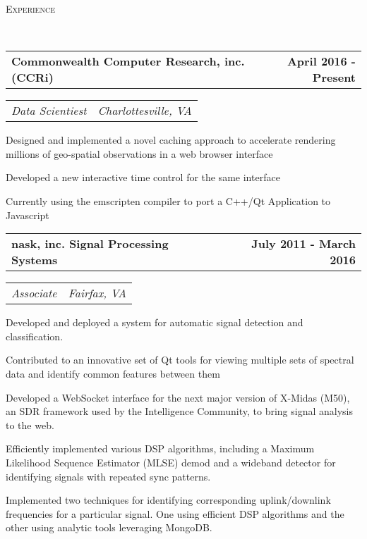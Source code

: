 \documentclass[10pt]{article}
\makeatletter
\newenvironment{changemargin}[2]{%
  \begin{list}{}{%
    \setlength{\topsep}{0pt}%
    \setlength{\leftmargin}{#1}%
    \setlength{\rightmargin}{#2}%
    \setlength{\listparindent}{\parindent}%
    \setlength{\itemindent}{\parindent}%
    \setlength{\parsep}{\parskip}%
  }%
  \item[]}{\end{list}
}
\newcommand{\lineover}{
	\begin{changemargin}{-0.05in}{-0.05in}
		\vspace*{-8pt}
		\hrulefill \\
		\vspace*{-2pt}
	\end{changemargin}
}
\newenvironment{body} {
	\begin{changemargin}{-0.25in}{-0.5in}
  }
	{\end{changemargin}
}
\newcommand{\headerrule}[1]{
    \vspace*{5pt}
    \begin{changemargin}{-0.5in}{-0.5in}
        \scshape{#1}\\
    \lineover
    \end{changemargin}
}
\newcommand{\headerrow}[2]
{\begin{tabular*}{\linewidth}{@{}l@{\extracolsep{\fill}}r}
	#1 &
	#2 \\
\end{tabular*}}
\newcommand{\CPP}
{C\nolinebreak[4]\hspace{-.05em}\raisebox{.22ex}{\footnotesize\bf ++ }}
\makeatother
\begin{document}
\headerrule{Experience}
\begin{body}
    \vspace{+0.5em}
    \headerrow
        {\textbf{Commonwealth Computer Research, inc. (CCRi)}}
        {\textbf{April 2016 - Present}}
    \headerrow
        {\emph{Data Scientiest}}
        {\emph{Charlottesville, VA}}
    \begin{itemize*}
        \item Designed and implemented a novel caching approach to accelerate
              rendering millions of geo-spatial observations in a web browser
              interface
        \item Developed a new interactive time control for the same interface
        \item Currently using the emscripten compiler to port a C++/Qt
              Application to Javascript

    \end{itemize*}

    \vspace{+0.5em}
    \headerrow
        {\textbf{n\texttildelow{}ask, inc. Signal Processing Systems}}
        {\textbf{July 2011 - March 2016}}
    \headerrow
        {\emph{Associate}}
        {\emph{Fairfax, VA}}
    \begin{itemize*}
        \item Developed and deployed a system for automatic signal
              detection and classification.
        \item Contributed to an innovative set of Qt tools for viewing multiple
              sets of spectral data and identify common features between them
        \item Developed a WebSocket interface for the next major
              version of X-Midas (M50), an SDR framework used by the Intelligence
              Community, to bring signal analysis to the web.
        \item Efficiently implemented various DSP algorithms, including
              a Maximum Likelihood Sequence Estimator (MLSE) demod and a wideband
              detector for identifying signals with repeated sync patterns.
        \item Implemented two techniques for identifying corresponding
              uplink/downlink frequencies for a particular signal. One using
              efficient DSP algorithms and the other using analytic tools
              leveraging MongoDB.
    \end{itemize*}


\end{body}
\end{document}
